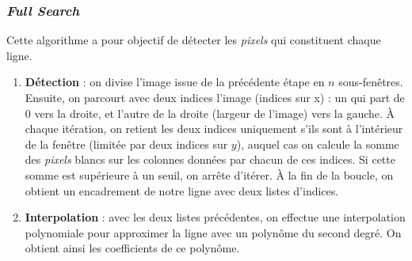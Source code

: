 \documentclass[12pt, openany]{report}
\begin{document}
\subsubsection{\textit{Full Search}}
Cette algorithme a pour objectif de détecter les \textit{pixels} qui constituent chaque ligne.
\begin{enumerate}
    \item \textbf{Détection} : on divise l'image issue de la précédente étape en $n$ sous-fenêtres. Ensuite, on parcourt avec deux indices l'image (indices sur x) : un qui part de 0 vers la droite, et l'autre de la droite (largeur de l'image) vers la gauche. À chaque itération, on retient les deux indices uniquement s'ils sont à l'intérieur de la fenêtre (limitée par deux indices sur $y$), auquel cas on calcule la somme des \textit{pixels} blancs sur les colonnes données par chacun de ces indices. Si cette somme est supérieure à un seuil, on arrête d'itérer. À la fin de la boucle, on obtient un encadrement de notre ligne avec deux listes d'indices.
    \item \textbf{Interpolation} : avec les deux listes précédentes, on effectue une interpolation polynomiale pour approximer la ligne avec un polynôme du second degré. On obtient ainsi les coefficients de ce polynôme.
\end{enumerate}
\end{document}
